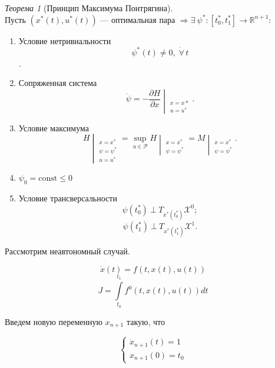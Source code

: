 \documentclass[oneside, final, 14pt, draft]{article}
\theoremstyle{definition}
\theoremstyle{definition}
\theoremstyle{remark}
\theoremstyle{theorem}
\newtheorem{thm}{Теорема}[section]
\renewcommand{\leq}{\leqslant}
\begin{document}
\begin{thm}[Принцип Максимума Понтрягина] \ \\
Пусть $\left( x^*(t), u^*(t)\right)$ --- оптимальная пара $\Rightarrow \exists\: \psi^*\colon \left[t_0^*, t_1^*\right] \rightarrow \mathbb{R}^{n+1}\colon$
\begin{enumerate}
\item Условие нетривиальности 
$$\psi^*(t) \neq 0,\;\dot\forall\,t$$.
\item Сопряженная система
\begin{equation*}
\dot{\psi} = \left.-\frac{\partial H}{\partial x}\middle|_{\substack{x = x* \\ u = u^*}}\right. .
\end{equation*}
\item Условие максимума
\begin{equation*}
\left. H \middle|_{\substack{x = x^* \\ \psi = \psi^* \\ u = u^*}}\right. =
 \sup\limits_{u \in \mathcal{P}} \left.H\middle|_{\substack{x = x^* \\ \psi = \psi^*}}\right. =
 \left. M \middle|_{\substack{x = x^* \\ \psi = \psi^*}}\right. .
\end{equation*}
\item $\psi_0 = \mathrm{const} \leq 0$
\item Условие трансверсальности
\begin{equation*}
\psi (t_0^*)\: \bot \: T_{x^*(t_0^*)} \mathcal{X}^0;
\end{equation*}
\begin{equation*}
\psi (t_1^*)\: \bot\: T_{x^*(t_1^*)} \mathcal{X}^1.
\end{equation*}
\end{enumerate}
\end{thm}

{\flushleft Рассмотрим неавтономный случай.}

$$ \dot{x}(t) = f(t, x(t), u(t))$$
$$ J = \int\limits_{t_0}^{t_1}f^0(t, x(t), u(t))dt$$

Введем новую переменную $x_{n+1}$ такую, что

\begin{equation*}
\begin{cases}
\dot x_{n+1}(t) =  1\\
x_{n+1}(0) = t_0
\end{cases}
\end{equation*}
\end{document}
